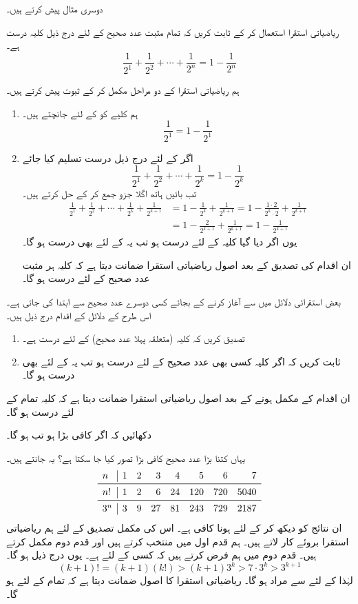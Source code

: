 دوسری   مثال پیش کرتے ہیں۔

ریاضیاتی  استقرا استعمال کر کے ثابت کریں کہ تمام مثبت عدد صحیح کے لئے درج ذیل کلیہ درست ہے۔
\[\frac{1}{2^1}+\frac{1}{2^2}+\cdots+\frac{1}{2^n}=1-\frac{1}{2^n}\]

ہم ریاضیاتی  استقرا کے دو  مراحل مکمل کر کے ثبوت پیش کرتے ہیں۔
\begin{enumerate}[1.]
\item
ہم کلیے کو  کے لئے جانچتے ہیں۔
\[\frac{1}{2^1}=1-\frac{1}{2^1}\]
\item
اگر  کے لئے درج ذیل درست تسلیم کیا جائے
\[\frac{1}{2^1}+\frac{1}{2^2}+\cdots+\frac{1}{2^k}=1-\frac{1}{2^k}\]
تب بائیں ہاتھ اگلا جزو جمع کر کے حل کرتے ہیں۔
\begin{align*}
\frac{1}{2^1}+\frac{1}{2^2}+\cdots+\frac{1}{2^k}+\frac{1}{2^{k+1}}&=1-\frac{1}{2^k}+\frac{1}{2^{k+1}}=1-\frac{1\cdot 2}{2^k\cdot 2}+\frac{1}{2^{k+1}}\\
&=1-\frac{2}{2^{k+1}}+\frac{1}{2^{k+1}}=1-\frac{1}{2^{k+1}}
\end{align*}
یوں  اگر دیا  گیا کلیہ   کے لئے درست ہو تب یہ   کے لئے بھی درست ہو گا۔

ان اقدام کی تصدیق کے بعد اصول ریاضیاتی  استقرا ضمانت دیتا ہے کہ کلیہ ہر مثبت عدد صحیح کے لئے درست ہو گا۔
\end{enumerate}

بعض  استقرائی دلائل میں  سے آغاز کرنے کے بجائے کسی  دوسرے عدد صحیح  سے  ابتدا کی جاتی ہے۔ اس طرح کے دلائل کے اقدام درج ذیل ہیں۔ 

\begin{enumerate}[1.]
\item
تصدیق کریں کہ کلیہ  (متعلقہ پہلا عدد صحیح)  کے لئے درست ہے۔
\item
ثابت کریں کہ اگر کلیہ کسی بھی عدد صحیح    کے لئے درست ہو تب یہ  کے لئے بھی درست ہو گا۔
\end{enumerate}
ان اقدام کے مکمل ہونے کے بعد اصول ریاضیاتی  استقرا ضمانت دیتا ہے کہ کلیہ تمام  کے لئے درست ہو گا۔

دکھائیں کہ اگر  کافی بڑا ہو تب  ہو گا۔

یہاں کتنا بڑا عدد صحیح کافی بڑا تصور کیا جا سکتا ہے؟ یہ جانتے ہیں۔
\[
\begin{array}{l|rrrrrrr}
n&1&2&3&4&5&6&7\\
\midrule
n!&1&2&6&24&120&720&5040\\
\midrule
3^n&3&9&27&81&243&729&2187
\end{array}
\]
ان نتائج کو دیکھ کر    کے لئے  ہونا   کافی ہے۔ اس کی مکمل  تصدیق کے لئے ہم ریاضیاتی  استقرا بروئے کار لاتے ہیں۔ ہم قدم اول میں  منتخب کرتے ہیں اور قدم دوم مکمل کرتے ہیں۔  قدم دوم میں ہم فرض کرتے ہیں کہ کسی  کے لئے  ہے۔ یوں درج ذیل ہو گا۔
\[(k+1)!=(k+1)(k!)>(k+1)3^k>7\cdot 3^k>3^{k+1}\]
لہٰذا   کے لئے   سے مراد  ہو گا۔ ریاضیاتی  استقرا کا اصول ضمانت دیتا ہے کہ تمام  کے لئے  ہو گا۔

